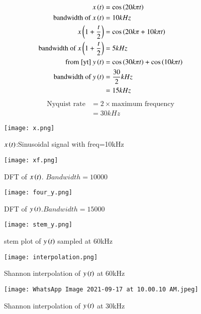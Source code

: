 \documentclass[journal,12pt,twocolumn]{IEEEtran}
\begin{document}
\begin{align}
  x\left(t\right)&=\cos{\ensuremath{\left(20k\pi t\right)}}\\
    \text{bandwidth of } x\left(t\right) &= 10 kHz\\
    x\left(1+\frac{t}{2}\right) &= \cos{\ensuremath{\left(20k\pi+10k\pi t\right)}}\\
    \text{bandwidth of } x\left(1+\frac{t}{2}\right) &=  5 kHz\\
    \text{from \eqref{yt} } 
    y\left(t\right)&= \cos{\ensuremath{\left(30k\pi t\right)}}+\cos{\ensuremath{\left(10k\pi t\right)}}\\
    \text{bandwidth of } y\left(t\right) &= \frac{30}{2} kHz\\
    &= 15 kHz
\end{align}
\begin{align}
    \text{Nyquist rate} &= 2 \times \text{maximum frequency}\\
    &= 30 kHz
\end{align}
\begin{figure}[!h]
 \centering
 \texttt{[image: x.png]}
 \caption{$x\left(t\right)$:Sinusoidal signal with freq=10kHz}
\end{figure}
\begin{figure}[!h]
 \centering
 \texttt{[image: xf.png]}
 \caption{DFT of $x\left(t\right)$. $Bandwidth=10000$}
\end{figure}
\begin{figure}[!h]
 \centering
 \texttt{[image: four\_y.png]}
 \caption{DFT of $y\left(t\right)$.$Bandwidth=15000$}
\end{figure}
\begin{figure}[!h]
 \centering
 \texttt{[image: stem\_y.png]}
 \caption{stem plot of $y\left(t\right)$ sampled at 60kHz}
\end{figure}
\begin{figure}[!h]
 \centering
 \texttt{[image: interpolation.png]}
 \caption{Shannon interpolation of $y\left(t\right)$ at 60kHz} 
\end{figure}
\begin{figure}[!h]
 \centering
 \texttt{[image: WhatsApp Image 2021-09-17 at 10.00.10 AM.jpeg]}
 \caption{Shannon interpolation of $y\left(t\right)$ at 30kHz}
\end{figure}
\end{document}
